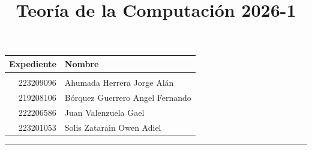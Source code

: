 \documentclass[12pt]{article}
\title
{
    Teoría de la Computación 2026-1 \\
}
\begin{document}
    \maketitle

    \begin{center}
        \begin{tabular}{r|l}
            \textbf{Expediente} & \textbf{Nombre} \\\hline \vspace{-0.4cm} \\
            223209096 & Ahumada Herrera Jorge Alán \\
            219208106 & Bórquez Guerrero Angel Fernando \\
            222206586 & Juan Valenzuela Gael \\
            223201053 & Solis Zatarain Owen Adiel \\
        \end{tabular}
    \end{center}

    \rule{\linewidth}{0.3mm}

    \vspace{0.3cm}
\end{document}
